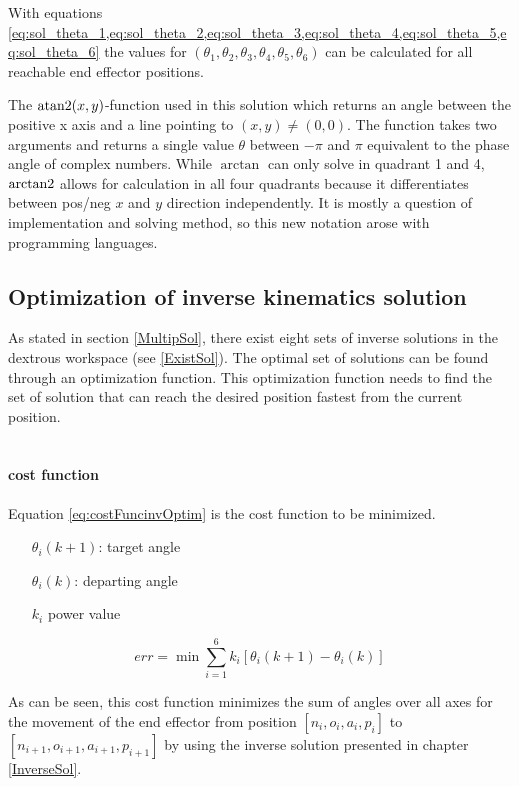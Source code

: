 With equations \cref{eq:sol_theta_1,eq:sol_theta_2,eq:sol_theta_3,eq:sol_theta_4,eq:sol_theta_5,eq:sol_theta_6} the values for $(\theta_1, \theta_2, \theta_3, \theta_4, \theta_5, \theta_6)$ can be calculated for all reachable end effector positions.

The $\operatorname{atan2}(x,y)$-function used in this solution which returns an angle between the positive x axis and a line pointing to $(x,y) \neq (0,0)$. The function takes two arguments and returns a single value $\theta$ between $-\pi$ and $\pi$ equivalent to the phase angle of complex numbers. While $\arctan$ can only solve in quadrant 1 and 4, $\operatorname{arctan2}$ allows for calculation in all four quadrants because it differentiates between pos/neg $x$  and  $y$ direction independently. It is mostly a question of implementation and solving method, so this new notation arose with programming languages.


\subsection{Optimization of inverse kinematics solution}

As stated in section \ref{MultipSol}, there exist eight sets of inverse solutions in the dextrous workspace (see \ref{ExistSol}).
The optimal set of solutions can be found through an optimization function. 
This optimization function needs to find the set of solution that can reach the desired position fastest from the current position.\\
\\
\paragraph{cost function}
Equation \ref{eq:costFuncinvOptim} is the cost function to be minimized.
\begin{itemize}
	\item[$\theta_i (k+1)$:] target angle
	\item[$\theta_i(k)$:] departing angle
	\item[$k_i$] power value
\end{itemize}

\begin{equation}\label{eq:costFuncinvOptim}
	err =  \min\sum_{i=1}^{6} k_i [\theta_i (k+1) - \theta_i(k)] 
\end{equation}

As can be seen, this cost function minimizes the sum of angles over all axes for the movement of the end effector from position $[n_i,o_i,a_i,p_i ]$ to $[n_{i+1}, o_{i+1}, a_{i+1}, p_{i+1}]$ by using the inverse solution presented in chapter \ref{InverseSol}.

